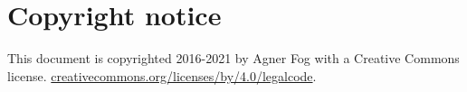 \documentclass[forwardcom.tex]{subfiles}
\begin{document}
\RaggedRight

\chapter{Copyright notice}
This document is copyrighted 2016-2021 by Agner Fog with a Creative Commons license.
\href{https://creativecommons.org/licenses/by/4.0/legalcode}{creativecommons.org/licenses/by/4.0/legalcode}.
\end{document}
